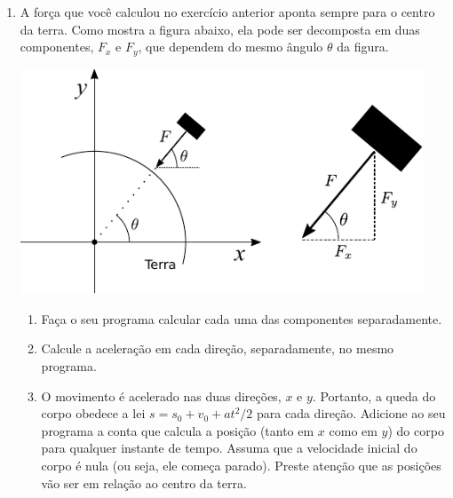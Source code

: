 \documentclass[10pt,a4paper,ssfamily]{exam}
\begin{document}
\begin{enumerate}
\item
A força que você calculou no exercício anterior aponta sempre para o
centro da terra. Como mostra a figura abaixo, ela pode ser decomposta em
duas componentes, $F_x$ e $F_y$, que dependem do mesmo ângulo $\theta$
da figura.
\begin{center}
\includegraphics[width=12cm]{./figuras/terra2.pdf}
\end{center}
\begin{enumerate}
\item
Faça o seu programa calcular cada uma das componentes separadamente.
\item
Calcule a aceleração em cada direção, separadamente, no mesmo programa.
\item
O movimento é acelerado nas duas direções, $x$ e $y$. Portanto, a queda
do corpo obedece a lei $s = s_0 + v_0 + at^2/2$ para cada direção.
Adicione ao seu programa a conta que calcula a posição (tanto em $x$
como em $y$) do corpo para qualquer instante de tempo. Assuma que a
velocidade inicial do corpo é nula (ou seja, ele começa parado). Preste
atenção que as posições vão ser em relação ao centro da terra.  
\end{enumerate}


\end{enumerate}
\end{document}
